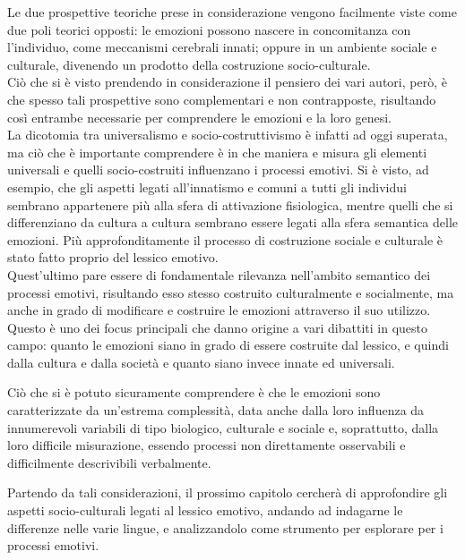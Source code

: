 Le due prospettive teoriche prese in considerazione vengono facilmente viste come due poli teorici opposti: le emozioni possono nascere in concomitanza con l'individuo, come meccanismi cerebrali innati; oppure in un ambiente sociale e culturale, divenendo un prodotto della costruzione socio-culturale.\\
Ciò che si è visto prendendo in considerazione il pensiero dei vari autori, però, è che spesso tali prospettive sono complementari e non contrapposte, risultando così entrambe necessarie per comprendere le emozioni e la loro genesi.\\
La dicotomia tra universalismo e socio-costruttivismo è infatti ad oggi superata, ma ciò che è importante comprendere è in che maniera e misura gli elementi universali e quelli socio-costruiti influenzano i processi emotivi. Si è visto, ad esempio, che gli aspetti legati all'innatismo e comuni a tutti gli individui sembrano appartenere più alla sfera di attivazione fisiologica, mentre quelli che si differenziano da cultura a cultura sembrano essere legati alla sfera semantica delle emozioni. Più approfonditamente il processo di costruzione sociale e culturale è stato fatto proprio del lessico emotivo.\\
Quest'ultimo pare essere di fondamentale rilevanza nell'ambito semantico dei processi emotivi, risultando esso stesso costruito culturalmente e socialmente, ma anche in grado di modificare e costruire le emozioni attraverso il suo utilizzo. \\
Questo è uno dei focus principali che danno origine a vari dibattiti in questo campo: quanto le emozioni siano in grado di essere costruite dal lessico, e quindi dalla cultura e dalla società e quanto siano invece innate ed universali.

Ciò che si è potuto sicuramente comprendere è che le emozioni sono caratterizzate da un'estrema complessità, data anche dalla loro influenza da innumerevoli variabili di tipo biologico, culturale e sociale e, soprattutto, dalla loro difficile misurazione, essendo processi non direttamente osservabili e difficilmente descrivibili verbalmente. 

Partendo da tali considerazioni, il prossimo capitolo cercherà di approfondire gli aspetti socio-culturali legati al lessico emotivo, andando ad indagarne le differenze nelle varie lingue, e analizzandolo come strumento per esplorare per i processi emotivi.

